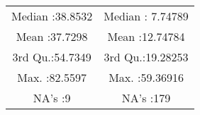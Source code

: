 \documentclass[
]{article}
\begin{document}
\begin{longtable}[]{@{}cc@{}}
\begin{minipage}[t]{0.41\columnwidth}
Median :38.8532\strut
\end{minipage} & \begin{minipage}[t]{0.43\columnwidth}\centering
Median : 7.74789\strut
\end{minipage}\tabularnewline
\begin{minipage}[t]{0.41\columnwidth}\centering
Mean :37.7298\strut
\end{minipage} & \begin{minipage}[t]{0.43\columnwidth}\centering
Mean :12.74784\strut
\end{minipage}\tabularnewline
\begin{minipage}[t]{0.41\columnwidth}\centering
3rd Qu.:54.7349\strut
\end{minipage} & \begin{minipage}[t]{0.43\columnwidth}\centering
3rd Qu.:19.28253\strut
\end{minipage}\tabularnewline
\begin{minipage}[t]{0.41\columnwidth}\centering
Max. :82.5597\strut
\end{minipage} & \begin{minipage}[t]{0.43\columnwidth}\centering
Max. :59.36916\strut
\end{minipage}\tabularnewline
\begin{minipage}[t]{0.41\columnwidth}\centering
NA's :9\strut
\end{minipage} & \begin{minipage}[t]{0.43\columnwidth}\centering
NA's :179\strut
\end{minipage}\tabularnewline
\bottomrule
\end{longtable}
\end{document}
